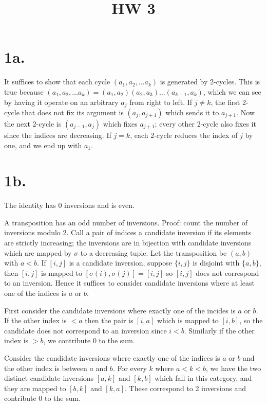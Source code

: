 \documentclass{article}
\title{HW 3}
\date{}
\begin{document}
\maketitle

\section*{1a.}

It suffices to show that each cycle $(a_1, a_2, \ldots a_k)$ is generated by 2-cycles. This is true because $(a_1, a_2, \ldots a_k) = (a_1, a_2)(a_2, a_3)\ldots(a_{k-1}, a_k)$, which we can see by having it operate on an arbitrary $a_j$ from right to left. If $j \ne k$, the first 2-cycle that does not fix its argument is $(a_j, a_{j+1})$ which sends it to $a_{j+1}$. Now the next 2-cycle is $(a_{j-1}, a_j)$ which fixes $a_{j+1}$; every other 2-cycle also fixes it since the indices are decreasing. If $j = k$, each 2-cycle reduces the index of $j$ by one, and we end up with $a_1$.

\section*{1b.}

The identity has 0 inversions and is even.

A transposition has an odd number of inversions. Proof: count the number of inversions modulo 2. Call a pair of indices a candidate inversion if its elements are strictly increasing; the inversions are in bijection with candidate inversions which are mapped by $\sigma$ to a decreasing tuple. Let the transposition be $(a, b)$ with $a < b$. If $[i, j]$ is a candidate inversion, suppose $\{i, j\}$ is disjoint with $\{a, b\}$, then $[i, j]$ is mapped to $[\sigma(i), \sigma(j)] = [i, j]$ so $[i, j]$ does not correspond to an inversion. Hence it suffices to consider candidate inversions where at least one of the indices is $a$ or $b$.

First consider the candidate inversions where exactly one of the incides is $a$ or $b$. If the other index is $< a$ then the pair is $[i, a]$ which is mapped to $[i, b]$, so the candidate does not correspond to an inversion since $i < b$. Similarly if the other index is $> b$, we contribute 0 to the sum.

Consider the candidate inversions where exactly one of the indices is $a$ or $b$ and the other index is between $a$ and $b$. For every $k$ where $a < k < b$, we have the two distinct candidate inversions $[a, k]$ and $[k, b]$ which fall in this category, and they are mapped to $[b, k]$ and $[k, a]$. These correspond to 2 inversions and contribute 0 to the sum.
\end{document}

